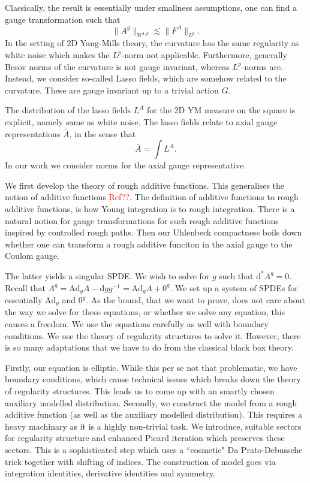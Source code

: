 \documentclass[11pt]{article}
\numberwithin{equation}{section}
\theoremstyle{definition}
\theoremstyle{remark}
\newcommand{\Ad}{\mathrm{Ad}}
\newcommand{\diff}{\mathrm{d}}
\newcommand{\1}{\mathbf 1}
\newcommand{\<}{\langle}
\renewcommand{\>}{\rangle}
\newcommand{\red}[1]{\textcolor{red}{#1}}
\begin{document}
Classically, the result is essentially under smallness assumptions, one can find a gauge transformation such that 
\[
\|A^g\|_{W^{1,p}}\lesssim \|F^A\|_{L^p}.
\]
In the setting of 2D Yang-Mills theory, the curvature has the same regularity as white noise which makes the $L^p$-norm not applicable. Furthermore, generally Besov norms of the curvature is not gauge invariant, whereas $L^p$-norms are. Instead, we consider so-called Lasso fields, which are somehow related to the curvature. These are gauge invariant up to a trivial action $G$. 

The distribution of the lasso fields $L^A$ for the 2D YM measure on the square is explicit, namely same as white noise. The lasso fields relate to axial gauge representations $\bar A$, in the sense that 
\[
\bar A=\int L^A. 
\]
In our work we consider norms for the axial gauge representative. 

We first develop the theory of rough additive functions. This generalises the notion of additive functions \red{Ref??}. The definition of additive functions to rough additive functions, is how Young integration is to rough integration. There is a natural notion for gauge transformations for such rough additive functions inspired by controlled rough paths. Then our Uhlenbeck compactness boils down whether one can transform a rough additive funciton in the axial gauge to the Coulom gauge. 

The latter yields a singular SPDE. We wish to solve for $g$ such that $\diff^*A^g=0$. Recall that $A^g=\Ad_gA-\diff gg^{-1}=\Ad_gA+0^g$. We set up a system of SPDEs for essentially $\Ad_g$ and $0^g$. As the bound, that we want to prove, does not care about the way we solve for these equations, or whether we solve any equation, this causes a freedom. We use the equations carefully as well with boundary conditions. We use the theory of regularity structures to solve it. However, there is so many adaptations that we have to do from the classical black box theory. 


Firstly, our equation is elliptic. While this per se not that problematic, we have boundary conditions, which cause technical issues which breaks down the theory of regularity structures. This leads us to come up with an smartly chosen auxiliary modelled distribution.  Secondly, we construct the model from a rough additive function (as well as the auxiliary modelled distribution). This requires a heavy machinary as it is a highly non-trivial task. We introduce, suitable sectors for regularity structure and enhanced Picard iteration which preserves these sectors. This is a sophisticated step which uses a ``cosmetic" Da Prato-Debussche trick together with shifting of indices.   The construction of model goes via integration identities, derivative identities and symmetry.  
\end{document}

